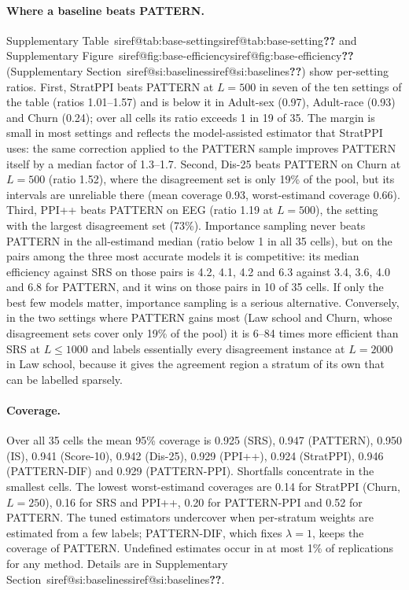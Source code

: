 \documentclass[pdflatex,sn-mathphys-num,iicol]{sn-jnl}
\makeatletter
\theoremstyle{thmstyleone}
\theoremstyle{thmstyletwo}
\theoremstyle{thmstylethree}
\newcommand{\SIref}[1]{\ifcsname siref@#1\endcsname\csname siref@#1\endcsname\else\textbf{??}\fi}
\makeatother
\begin{document}
\paragraph{Where a baseline beats PATTERN.} Supplementary Table~\SIref{tab:base-setting} and Supplementary Figure~\SIref{fig:base-efficiency} (Supplementary Section~\SIref{si:baselines}) show per-setting ratios. First, StratPPI beats PATTERN at $L=500$ in seven of the ten settings of the table (ratios 1.01--1.57) and is below it in Adult-sex (0.97), Adult-race (0.93) and Churn (0.24); over all cells its ratio exceeds 1 in 19 of 35. The margin is small in most settings and reflects the model-assisted estimator that StratPPI uses: the same correction applied to the PATTERN sample improves PATTERN itself by a median factor of 1.3--1.7. Second, Dis-25 beats PATTERN on Churn at $L=500$ (ratio 1.52), where the disagreement set is only 19\% of the pool, but its intervals are unreliable there (mean coverage 0.93, worst-estimand coverage 0.66). Third, PPI++ beats PATTERN on EEG (ratio 1.19 at $L=500$), the setting with the largest disagreement set (73\%). Importance sampling never beats PATTERN in the all-estimand median (ratio below 1 in all 35 cells), but on the pairs among the three most accurate models it is competitive: its median efficiency against SRS on those pairs is 4.2, 4.1, 4.2 and 6.3 against 3.4, 3.6, 4.0 and 6.8 for PATTERN, and it wins on those pairs in 10 of 35 cells. If only the best few models matter, importance sampling is a serious alternative. Conversely, in the two settings where PATTERN gains most (Law school and Churn, whose disagreement sets cover only 19\% of the pool) it is 6--84 times more efficient than SRS at $L\le1000$ and labels essentially every disagreement instance at $L=2000$ in Law school, because it gives the agreement region a stratum of its own that can be labelled sparsely.

\paragraph{Coverage.} Over all 35 cells the mean 95\% coverage is 0.925 (SRS), 0.947 (PATTERN), 0.950 (IS), 0.941 (Score-10), 0.942 (Dis-25), 0.929 (PPI++), 0.924 (StratPPI), 0.946 (PATTERN-DIF) and 0.929 (PATTERN-PPI). Shortfalls concentrate in the smallest cells. The lowest worst-estimand coverages are 0.14 for StratPPI (Churn, $L=250$), 0.16 for SRS and PPI++, 0.20 for PATTERN-PPI and 0.52 for PATTERN. The tuned estimators undercover when per-stratum weights are estimated from a few labels; PATTERN-DIF, which fixes $\lambda=1$, keeps the coverage of PATTERN. Undefined estimates occur in at most 1\% of replications for any method. Details are in Supplementary Section~\SIref{si:baselines}.
\end{document}
